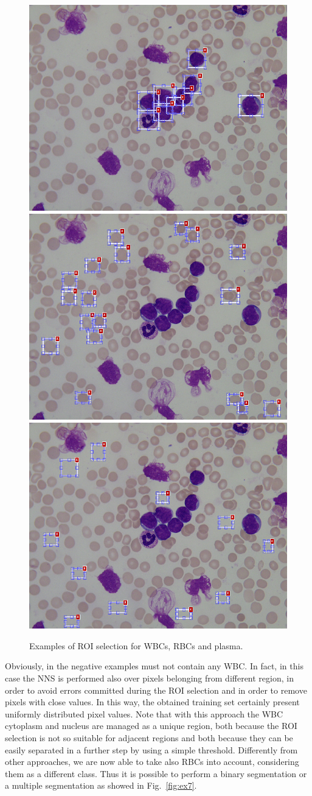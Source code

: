 \documentclass[final,a4paper,12pt,english]{UnicaPhdThesis3}
\begin{document}
\begin{figure}[!b]
	\centering
	\includegraphics[height=0.25\textwidth]{images/2015_1_caip/ROI1}
	\includegraphics[height=0.25\textwidth]{images/2015_1_caip/ROI2}
	\includegraphics[height=0.25\textwidth]{images/2015_1_caip/ROI3}
	\caption{\label{fig:ex6}Examples of ROI selection for WBCs, RBCs and plasma.}
\end{figure}

Obviously, in the negative examples must not contain any WBC. In fact, in this case the NNS is performed also over pixels belonging from different region, in order to avoid errors committed during the ROI selection and in order to remove pixels with close values. In this way, the obtained training set certainly present uniformly distributed pixel values. Note that with this approach the WBC cytoplasm and nucleus are managed as a unique region, both because the ROI selection is not so suitable for adjacent regions and both because they can be easily separated in a further step by using a simple threshold. Differently from other approaches, we are now able to take also RBCs into account, considering them as a different class.
Thus it is possible to perform a binary segmentation or a multiple segmentation as showed in Fig.~\ref{fig:ex7}.
\end{document}
